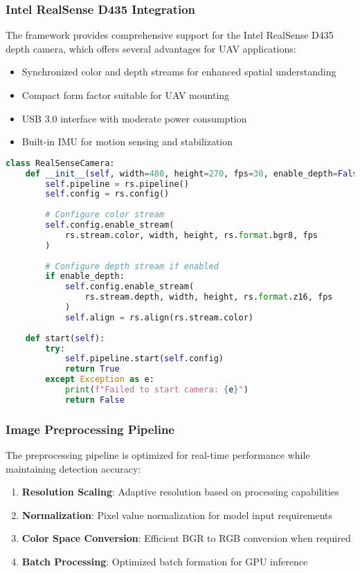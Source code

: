 \documentclass[11pt,a4paper]{article}
\begin{document}
\subsubsection{Intel RealSense D435 Integration}

The framework provides comprehensive support for the Intel RealSense D435 depth camera, which offers several advantages for UAV applications:

\begin{itemize}
    \item Synchronized color and depth streams for enhanced spatial understanding
    \item Compact form factor suitable for UAV mounting
    \item USB 3.0 interface with moderate power consumption
    \item Built-in IMU for motion sensing and stabilization
\end{itemize}

\begin{lstlisting}[language=Python, caption=RealSense Camera Initialization]
class RealSenseCamera:
    def __init__(self, width=480, height=270, fps=30, enable_depth=False):
        self.pipeline = rs.pipeline()
        self.config = rs.config()
        
        # Configure color stream
        self.config.enable_stream(
            rs.stream.color, width, height, rs.format.bgr8, fps
        )
        
        # Configure depth stream if enabled
        if enable_depth:
            self.config.enable_stream(
                rs.stream.depth, width, height, rs.format.z16, fps
            )
            self.align = rs.align(rs.stream.color)
    
    def start(self):
        try:
            self.pipeline.start(self.config)
            return True
        except Exception as e:
            print(f"Failed to start camera: {e}")
            return False
\end{lstlisting}

\subsubsection{Image Preprocessing Pipeline}

The preprocessing pipeline is optimized for real-time performance while maintaining detection accuracy:

\begin{enumerate}
    \item \textbf{Resolution Scaling}: Adaptive resolution based on processing capabilities
    \item \textbf{Normalization}: Pixel value normalization for model input requirements
    \item \textbf{Color Space Conversion}: Efficient BGR to RGB conversion when required
    \item \textbf{Batch Processing}: Optimized batch formation for GPU inference
\end{enumerate}
\end{document}
